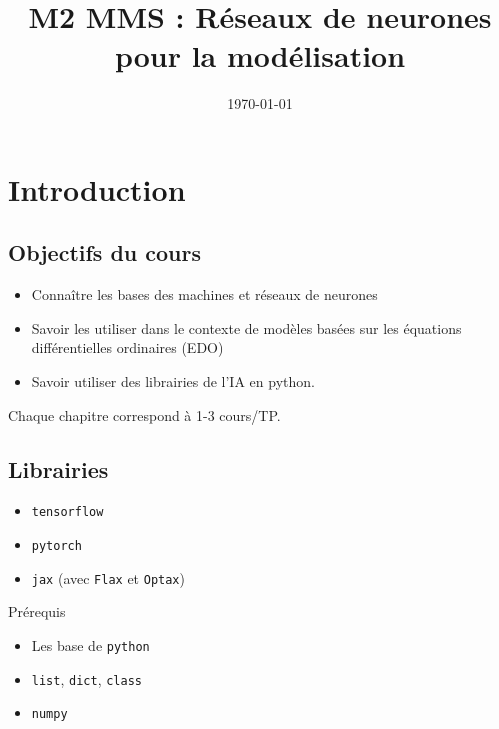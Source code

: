 \documentclass[11pt,a4paper, french]{article}
\title{M2 MMS : Réseaux de neurones pour la modélisation}
\author{}
\date{\today}
\begin{document}

\maketitle
\tableofcontents
%
\section*{Introduction}\label{sec:}
%
\subsection*{Objectifs du cours}\label{subsec:}
%
\begin{itemize}
\item Connaître les bases des machines et réseaux de neurones
\item Savoir les utiliser dans le contexte de modèles basées sur les équations différentielles ordinaires (EDO)
\item Savoir utiliser des librairies de l'IA en python.
\end{itemize}
%
Chaque chapitre correspond à 1-3 cours/TP.
%
\subsection*{Librairies}\label{subsec:}
%
\begin{itemize}
\item \texttt{tensorflow}
\item \texttt{pytorch}
\item \texttt{jax} (avec \texttt{Flax} et \texttt{Optax})
\end{itemize}
%
Prérequis
\begin{itemize}
\item Les base de \texttt{python}
\item \texttt{list}, \texttt{dict}, \texttt{class}
\item \texttt{numpy}
\end{itemize}
%
\end{document}
